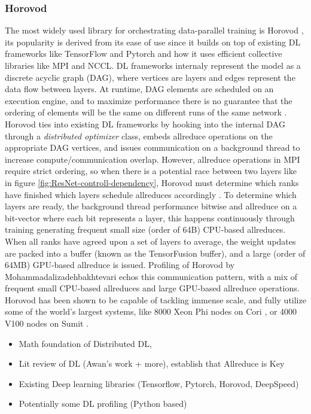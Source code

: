 \subsubsection{Horovod}
The most widely used library for orchestrating data-parallel training is Horovod \cite{Sergeev2018Horovod}, its popularity is derived from its ease of use since it builds on top of existing DL frameworks like TensorFlow and Pytorch and how it uses efficient collective libraries like MPI and NCCL.
DL frameworks internaly represent the model as a discrete acyclic graph (DAG), where vertices are layers and edges represent the data flow between layers.
At runtime, DAG elements are scheduled on an execution engine, and to maximize performance there is no guarantee that the ordering of elements will be the same on different runs of the same network \cite{Abadi2015TensorflowWhitepaper}. 
Horovod ties into existing DL frameworks by hooking into the internal DAG through a \textit{distributed optimizer} class, embeds allreduce operations on the appropriate DAG vertices, and issues communication on a background thread to increase compute/communication overlap.
However, allreduce operations in MPI require strict ordering, so when there is a potential race between two layers like in figure \ref{fig:ResNet-controll-dependency}, Horovod must determine which ranks have finished which layers schedule allreduces accordingly \cite{Kurth2019TFatScaleAnalysisOfHvdAndCPEML}.  
To determine which layers are ready, the background thread performance bitwise and allreduce on a bit-vector where each bit represents a layer, this happens continuously through training generating frequent small size (order of 64B) CPU-based allreduces.
When all ranks have agreed upon a set of layers to average, the weight updates are packed into a buffer (known as the TensorFusion buffer), and a large (order of 64MB) GPU-based allreduce is issued.
Profiling of Horovod by Mohammadalizadehbakhtevari \cite{Mohammadalizadehbakhtevari2021Thesis} echos this communication pattern, with a mix of frequent small CPU-based allreduces and large GPU-based allreduce operations.
Horovod has been shown to be capable of tackling immense scale, and fully utilize some of the world's largest systems, like 8000 Xeon Phi nodes on Cori \cite{Mathuriya2019Cosmoflow}, or 4000 V100 nodes on Sumit \cite{Kurth2018ExascaleDLClimate}.


\begin{itemize}
    \item Math foundation of Distributed DL, \cite{Ben-Nun2019DemystifyDL}
    \item Lit review of DL (Awan's work + more), establish that Allreduce is Key
    \item Existing Deep learning libraries (Tensorflow, Pytorch, Horovod, DeepSpeed)
    \item Potentially some DL profiling (Python based)
\end{itemize}



\clearpage